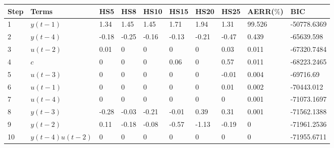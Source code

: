 \begin{tabular}{llllllllll}
Step & Terms & HS5 & HS8 & HS10 & HS15 & HS20 & HS25 & AERR($\%$) & BIC \\ 
\hline 
1 & $y(t-1)$ & 1.34 & 1.45 & 1.45 & 1.71 & 1.94 & 1.31 & 99.526 & -50778.6369 \\ 
2 & $y(t-4)$ & -0.18 & -0.25 & -0.16 & -0.13 & -0.21 & -0.47 & 0.439 & -65639.598 \\ 
3 & $u(t-2)$ & 0.01 & 0 & 0 & 0 & 0 & 0.03 & 0.011 & -67320.7484 \\ 
4 & $c$ & 0 & 0 & 0 & 0.06 & 0 & 0.57 & 0.011 & -68223.2465 \\ 
5 & $u(t-3)$ & 0 & 0 & 0 & 0 & 0 & -0.01 & 0.004 & -69716.69 \\ 
6 & $u(t-1)$ & 0 & 0 & 0 & 0 & 0 & 0.01 & 0.002 & -70443.012 \\ 
7 & $u(t-4)$ & 0 & 0 & 0 & 0 & 0 & 0 & 0.001 & -71073.1697 \\ 
8 & $y(t-3)$ & -0.28 & -0.03 & -0.21 & -0.01 & 0.39 & 0.31 & 0.001 & -71562.1388 \\ 
9 & $y(t-2)$ & 0.11 & -0.18 & -0.08 & -0.57 & -1.13 & -0.19 & 0 & -71961.2536 \\ 
10 & $y(t-4)u(t-2)$ & 0 & 0 & 0 & 0 & 0 & 0 & 0 & -71955.6711 \\ 
\hline 
\end{tabular}